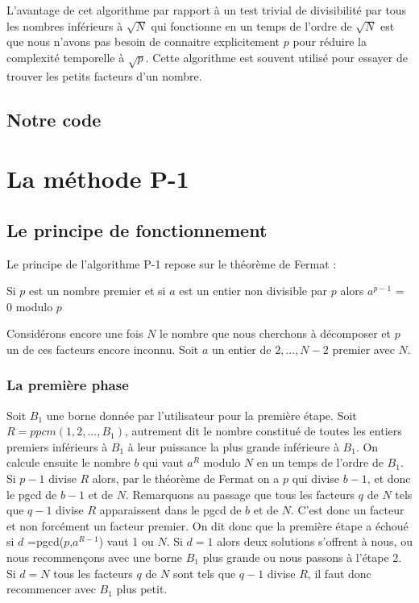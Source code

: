 \documentclass[10pt,a4paper]{report}
\begin{document}
	L'avantage de cet algorithme par rapport à un test trivial de divisibilité par tous les nombres inférieurs à $\sqrt N$ qui fonctionne en un temps de l'ordre de $ \sqrt N$ est que nous n'avons pas besoin de connaitre explicitement $p$ pour réduire la complexité temporelle à $ \sqrt p$. Cette algorithme est souvent utilisé pour essayer de trouver les petits facteurs d'un nombre.

\subsection{Notre code}


\section{La méthode P-1}

\subsection{Le principe de fonctionnement}


	Le principe de l'algorithme P-1 repose sur le théorème de Fermat :
	
	Si $p$ est un nombre premier et si $a$ est un entier non divisible par $p$ alors $a^{p-1}$ = 0 modulo $p$
	
	 Considérons encore une fois $N$ le nombre que nous cherchons à décomposer et $p$ un de ces facteurs encore inconnu. Soit $a$  un entier de {$2,...,N-2$} premier avec $N$.

\subsubsection{La première phase}


	 Soit $B_1$ une borne donnée par l'utilisateur pour la première étape. Soit $R = ppcm (1,2,...,B_1)$, autrement dit le nombre constitué de toutes les entiers premiers inférieurs à $B_1$ à leur puissance la plus grande inférieure à $B_1$. On calcule ensuite le nombre $b$ qui vaut $a^{R}$ modulo $N$ en un temps de l'ordre de $B_1$. Si $p-1$ divise $R$ alors, par le théorème de Fermat on a $p$ qui divise $b-1$, et donc le pgcd de $b-1$ et de $N$. Remarquons au passage que tous les facteurs $q$ de $N$ tels que $q-1$ divise $R$ apparaissent dans le pgcd de $b$ et de $N$. C'est donc un facteur et non forcément un facteur premier. On dit donc que la première étape a échoué si $d$ =pgcd($p$,$a^{R-1}$) vaut 1 ou $N$. Si $d = 1$ alors deux solutions s'offrent à nous, ou nous recommençons avec une borne $B_1$ plus grande ou nous passons à l'étape 2. Si $d = N$ tous les facteurs $q$ de $N$ sont tels que $q-1$ divise $R$, il faut donc recommencer avec $B_1$ plus petit. 
	 
\end{document}
